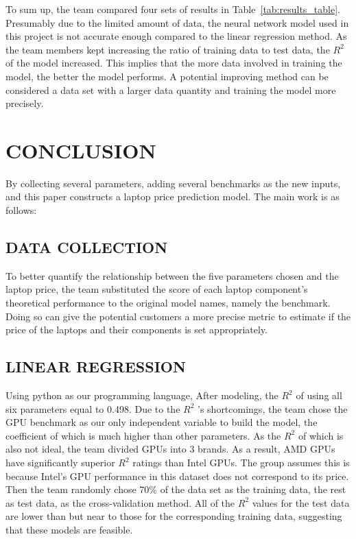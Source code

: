 \documentclass{scrartcl}
\begin{document}
\noindent To sum up, the team compared four sets of results in Table~\ref{tab:results_table}. Presumably due to the limited amount of data, the neural network model used in this project is not accurate enough compared to the linear regression method. As the team members kept increasing the ratio of training data to test data, the $R^2$ of the model increased. This implies that the more data involved in training the model, the better the model performs. A potential improving method can be considered a data set with a larger data quantity and training the model more precisely.\\




\section{CONCLUSION}




By collecting several parameters, adding several benchmarks as the new inputs, and this paper constructs a laptop price prediction model. The main work is as follows:\\

\subsection{DATA COLLECTION}
To better quantify the relationship between the five parameters chosen and the laptop price, the team substituted the score of each laptop component’s theoretical performance to the original model names, namely the benchmark. Doing so can give the potential customers a more precise metric to estimate if the price of the laptops and their components is set appropriately.\\
\subsection{LINEAR REGRESSION}
Using python as our programming language, After modeling, the $R^2$ of using all six parameters equal to 0.498. Due to the $R^2$ 's shortcomings, the team chose the GPU benchmark as our only independent variable to build the model, the coefficient of which is much higher than other parameters. As the $R^2$ of which is also not ideal, the team divided GPUs into 3 brands. As a result, AMD GPUs have significantly superior $R^2$ ratings than Intel GPUs. The group assumes this is because Intel's GPU performance in this dataset does not correspond to its price. Then the team randomly chose 70\% of the data set as the training data, the rest as test data, as the cross-validation method. All of the $R^2$ values for the test data are lower than but near to those for the corresponding training data, suggesting that these models are feasible.\\
\end{document}

